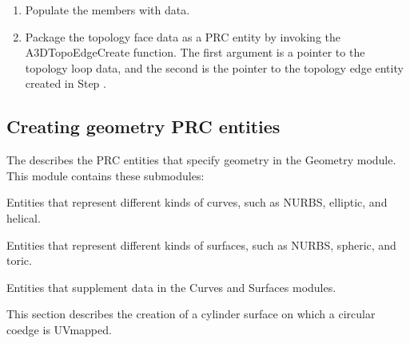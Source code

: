 \documentclass[letterpaper,12pt,english,openany,oneside]{sphinxmanual}
\begin{document}
\begin{sphinxVerbatim}[commandchars=\\\{\}]
 
\end{sphinxVerbatim}
\begin{enumerate}
%
\setcounter{enumi}{2}
\item {} 
Populate the members with data.

\item {} 
Package the topology face data as a PRC entity by invoking the A3DTopoEdgeCreate function. The first argument is a pointer to the topology loop data, and the second is the pointer to the topology edge entity created in Step .

\end{enumerate}

\begin{sphinxVerbatim}[commandchars=\\\{\}]
    
\end{sphinxVerbatim}


\subsection{Creating geometry PRC entities}
\label{\detokenize{Plugins_A3D_API:creating-geometry-prc-entities}}
The  describes the PRC entities that specify geometry in the Geometry module. This module contains these submodules:

 Entities that represent different kinds of curves, such as NURBS, elliptic, and helical.

 Entities that represent different kinds of surfaces, such as NURBS, spheric, and toric.

 Entities that supplement data in the Curves and Surfaces modules.

This section describes the creation of a cylinder surface on which a circular co\sphinxhyphen{}edge is UV\sphinxhyphen{}mapped.
\end{document}
